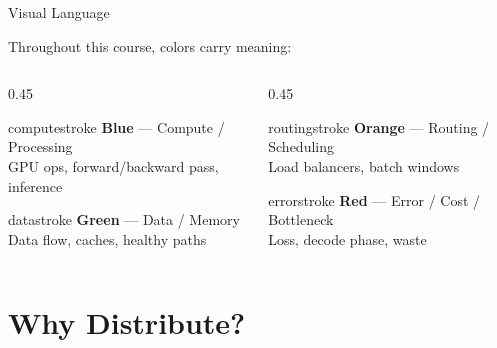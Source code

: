 \documentclass[aspectratio=169, 12pt]{beamer}
\begin{document}
\begin{frame}{Visual Language}
\note{
}

\small
Throughout this course, colors carry meaning:

\vspace{0.3cm}
\begin{columns}[T]
  \begin{column}{0.45\textwidth}
    \begin{mlsyscard}{computestroke}
    \textbf{Blue} --- Compute / Processing\\
    {\footnotesize GPU ops, forward/backward pass, inference}
    \end{mlsyscard}
    \vspace{0.15cm}
    \begin{mlsyscard}{datastroke}
    \textbf{Green} --- Data / Memory\\
    {\footnotesize Data flow, caches, healthy paths}
    \end{mlsyscard}
  \end{column}
  \begin{column}{0.45\textwidth}
    \begin{mlsyscard}{routingstroke}
    \textbf{Orange} --- Routing / Scheduling\\
    {\footnotesize Load balancers, batch windows}
    \end{mlsyscard}
    \vspace{0.15cm}
    \begin{mlsyscard}{errorstroke}
    \textbf{Red} --- Error / Cost / Bottleneck\\
    {\footnotesize Loss, decode phase, waste}
    \end{mlsyscard}
  \end{column}
\end{columns}
\end{frame}



\section{Why Distribute?}
\end{document}
